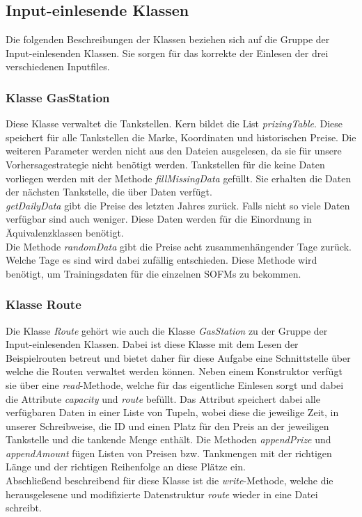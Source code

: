 \documentclass[11pt]{article}
\begin{document}
\subsection{Input-einlesende Klassen}
	Die folgenden Beschreibungen der Klassen beziehen sich auf die Gruppe der Input-einlesenden Klassen. Sie sorgen für das korrekte der Einlesen der drei verschiedenen Inputfiles.
\subsubsection{Klasse GasStation}
	Diese Klasse verwaltet die Tankstellen. Kern bildet die List \textit{prizingTable}. Diese speichert für alle Tankstellen die Marke, Koordinaten und historischen Preise. Die weiteren Parameter werden nicht aus den Dateien ausgelesen, da sie für unsere Vorhersagestrategie nicht benötigt werden. Tankstellen für die keine Daten vorliegen werden mit der Methode \textit{fillMissingData} gefüllt. Sie erhalten die Daten der nächsten Tankstelle, die über Daten verfügt.\\
	\textit{getDailyData} gibt die Preise des letzten Jahres zurück. Falls nicht so viele Daten verfügbar sind auch weniger. Diese Daten werden für die Einordnung in Äquivalenzklassen benötigt.\\
	Die Methode \textit{randomData} gibt die Preise acht zusammenhängender Tage zurück. Welche Tage es sind wird dabei zufällig entschieden. Diese Methode wird benötigt, um Trainingsdaten für die einzelnen SOFMs zu bekommen.
\subsubsection{Klasse Route}
	Die Klasse \textit{Route} gehört wie auch die Klasse \textit{GasStation} zu der Gruppe der Input-einlesenden Klassen. Dabei ist diese Klasse mit dem Lesen der Beispielrouten betreut und bietet daher für diese Aufgabe eine Schnittstelle über welche die Routen verwaltet werden können. Neben einem Konstruktor verfügt sie über eine \textit{read}-Methode, welche für das eigentliche Einlesen sorgt und dabei die Attribute \textit{capacity} und \textit{route} befüllt. Das Attribut speichert dabei alle verfügbaren Daten in einer Liste von Tupeln, wobei diese die jeweilige Zeit, in unserer Schreibweise, die ID und einen Platz für den Preis an der jeweiligen Tankstelle und die tankende Menge enthält. Die Methoden \textit{appendPrize} und \textit{appendAmount} fügen Listen von Preisen bzw. Tankmengen mit der richtigen Länge und der richtigen Reihenfolge an diese Plätze ein. \\
	Abschließend beschreibend für diese Klasse ist die \textit{write}-Methode, welche die herausgelesene und modifizierte Datenstruktur \textit{route} wieder in eine Datei schreibt.
\end{document}
